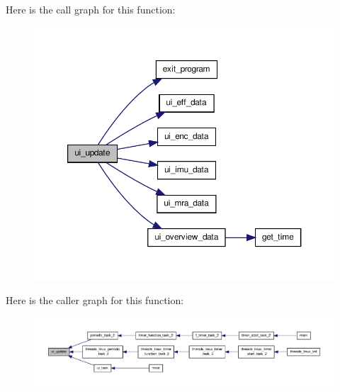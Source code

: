 Here is the call graph for this function\-:
\nopagebreak
\begin{figure}[H]
\begin{center}
\leavevmode
\includegraphics[width=350pt]{group__ui_ga42e4dac2d138061a74c572358c8ebf49_cgraph}
\end{center}
\end{figure}




Here is the caller graph for this function\-:
\nopagebreak
\begin{figure}[H]
\begin{center}
\leavevmode
\includegraphics[width=350pt]{group__ui_ga42e4dac2d138061a74c572358c8ebf49_icgraph}
\end{center}
\end{figure}


